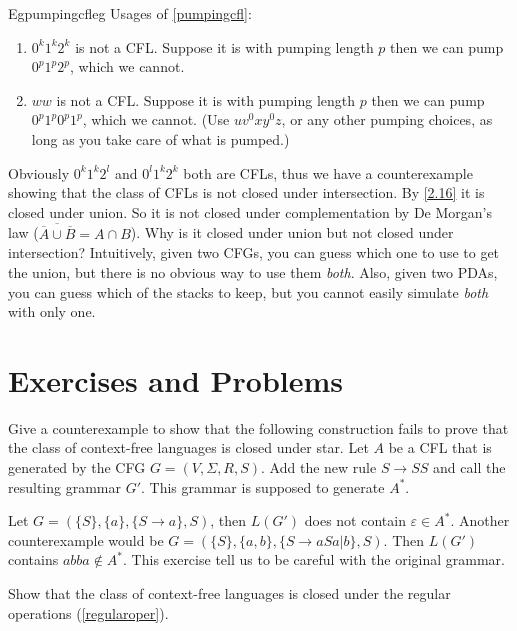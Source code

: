 \begin{reference}{Eg}{pumpingcfleg} Usages of \ref{pumpingcfl}:
  \begin{enumerate}
    \item $0^k1^k2^k$ is not a CFL. Suppose it is with pumping length $p$ then we can pump $0^p1^p2^p$, which we cannot.
    \item $ww$ is not a CFL. Suppose it is with pumping length $p$ then we can pump $0^p1^p0^p1^p$, which we cannot. (Use $uv^0xy^0z$, or any other pumping choices, as long as you take care of what is pumped.)\qedhere
  \end{enumerate}
\end{reference}

Obviously $0^k1^k2^l$ and $0^l1^k2^k$ both are CFLs, thus we have a counterexample showing that the class of CFLs is not closed under intersection. By \ref{2.16} it is closed under union. So it is not closed under complementation by De Morgan's law ($\overline{\overline{A}\cup \overline{B}}=A\cap B$). Why is it closed under union but not closed under intersection? Intuitively, given two CFGs, you can guess which one to use to get the union, but there is no obvious way to use them \textit{both}. Also, given two PDAs, you can guess which of the stacks to keep, but you cannot easily simulate \textit{both} with only one.

\section*{Exercises and Problems}

\setcounter{exercise}{14}

\begin{exercise}{2.15}
  Give a counterexample to show that the following construction fails to prove that the class of context-free languages is closed under star. Let \( A \) be a CFL that is generated by the CFG \( G = (V, \Sigma, R, S) \). Add the new rule \( S \rightarrow SS \) and call the resulting grammar \( G' \). This grammar is supposed to generate \( A^* \).
\end{exercise}

Let $G=(\{S\}, \{a\}, \{S\to a\}, S)$, then $L(G')$ does not contain $\varepsilon\in A^*$. Another counterexample would be $G=(\{S\},\{a,b\},\{S\to aSa|b\},S)$. Then $L(G')$ contains $abba\notin A^*$. This exercise tell us to be careful with the original grammar.

\begin{exercise}{2.16}
  Show that the class of context-free languages is closed under the regular operations (\ref{regularoper}).
\end{exercise}

